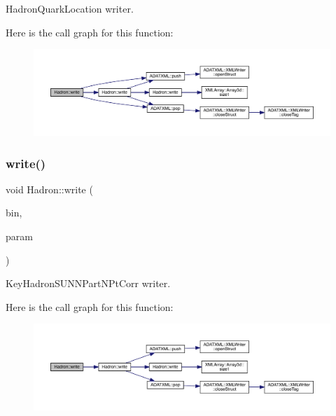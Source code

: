 Hadron\+Quark\+Location writer. 

Here is the call graph for this function\+:\nopagebreak
\begin{figure}[H]
\begin{center}
\leavevmode
\includegraphics[width=350pt]{d1/daf/namespaceHadron_a2737e3c3e39c76c6dbe81ce5e484f6cc_cgraph}
\end{center}
\end{figure}
\mbox{\label{namespaceHadron_acd7055ec4bbdda7ceb335f7271aee72e}} 
\subsubsection{\texorpdfstring{write()}{write()}\hspace{0.1cm}{\footnotesize\ttfamily [48/95]}}
{\footnotesize\ttfamily void Hadron\+::write (\begin{DoxyParamCaption}\item[{\mbox{\hyperlink{classADATIO_1_1BinaryWriter}{Binary\+Writer}} \&}]{bin,  }\item[{const \mbox{\hyperlink{structHadron_1_1KeyHadronSUNNPartNPtCorr__t_1_1NPoint__t}{Key\+Hadron\+S\+U\+N\+N\+Part\+N\+Pt\+Corr\+\_\+t\+::\+N\+Point\+\_\+t}} \&}]{param }\end{DoxyParamCaption})}



Key\+Hadron\+S\+U\+N\+N\+Part\+N\+Pt\+Corr writer. 

Here is the call graph for this function\+:\nopagebreak
\begin{figure}[H]
\begin{center}
\leavevmode
\includegraphics[width=350pt]{d1/daf/namespaceHadron_acd7055ec4bbdda7ceb335f7271aee72e_cgraph}
\end{center}
\end{figure}
\mbox{\label{namespaceHadron_a9309edc67ae704a831f01ae854c5bf12}} 
